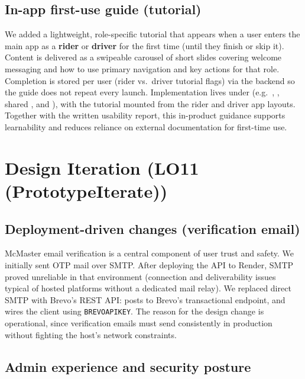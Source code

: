 \documentclass{article}
\begin{document}
\subsection{In-app first-use guide (tutorial)}

We added a lightweight, role-specific tutorial that appears when a user enters the main app as a \textbf{rider} or \textbf{driver} for the first time (until they finish or skip it). Content is delivered as a swipeable carousel of short slides covering welcome messaging and how to use primary navigation and key actions for that role. Completion is stored per user (rider vs.\ driver tutorial flags) via the backend so the guide does not repeat every launch. Implementation lives under  (e.g.\ , , shared , and ), with the tutorial mounted from the rider and driver app layouts. Together with the written usability report, this in-product guidance supports learnability and reduces reliance on external documentation for first-time use.

\section{Design Iteration (LO11 (PrototypeIterate))}
\label{sec:design_iteration_lo11}

\subsection{Deployment-driven changes (verification email)}

McMaster email verification is a central component of user trust and safety. We initially sent OTP mail over SMTP. After deploying the API to Render, SMTP proved unreliable in that environment (connection and deliverability issues typical of hosted platforms without a dedicated mail relay). We replaced direct SMTP with Brevo's REST API:  posts to Brevo's transactional endpoint, and  wires the client using \texttt{BREVO\textunderscore API\textunderscore KEY}. The reason for the design change is operational, since verification emails must send consistently in production without fighting the host's network constraints.

\subsection{Admin experience and security posture}
\end{document}
